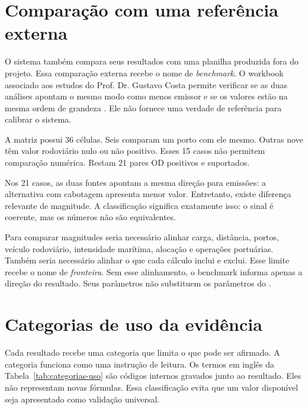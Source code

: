 \section{Comparação com uma referência externa}
\label{sec:benchmark-externo}

O sistema também compara seus resultados com uma planilha produzida fora do projeto. Essa comparação externa recebe o nome de \emph{benchmark}. O workbook associado aos estudos do Prof. Dr. Gustavo Costa permite verificar se as duas análises apontam o mesmo modo como menos emissor e se os valores estão na mesma ordem de grandeza \cite{competitiveness2024,decarb2024}. Ele não fornece uma verdade de referência para calibrar o sistema.

A matriz possui \num{36} células. Seis comparam um porto com ele mesmo. Outras nove têm valor rodoviário nulo ou não positivo. Esses 15 casos não permitem comparação numérica. Restam \num{21} pares OD positivos e suportados.

Nos 21 casos, as duas fontes apontam a mesma direção para emissões: a alternativa com cabotagem apresenta menor valor. Entretanto, existe diferença relevante de magnitude. A classificação  significa exatamente isso: o sinal é coerente, mas os números não são equivalentes.

Para comparar magnitudes seria necessário alinhar carga, distância, portos, veículo rodoviário, intensidade marítima, alocação e operações portuárias. Também seria necessário alinhar o que cada cálculo inclui e exclui. Esse limite recebe o nome de \emph{fronteira}. Sem esse alinhamento, o benchmark informa apenas a direção do resultado. Seus parâmetros não substituem os parâmetros do \CabotageLens{}.

\section{Categorias de uso da evidência}
\label{sec:categorias-uso}

Cada resultado recebe uma categoria que limita o que pode ser afirmado. A categoria funciona como uma instrução de leitura. Os termos em inglês da Tabela~\ref{tab:categorias-uso} são códigos internos gravados junto ao resultado. Eles não representam novas fórmulas. Essa classificação evita que um valor disponível seja apresentado como validação universal.

